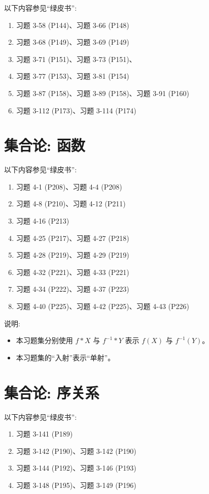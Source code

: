 \documentclass{article}
\begin{document}
以下内容参见``绿皮书'':
\begin{enumerate}[(1)]
  \item 习题 3-58 (P144)、习题 3-66 (P148)
  \item 习题 3-68 (P149)、习题 3-69 (P149)
  \item 习题 3-71 (P151)、习题 3-73 (P151)、
  \item 习题 3-77 (P153)、习题 3-81 (P154)
  \item 习题 3-87 (P158)、习题 3-89 (P158)、习题 3-91 (P160)
  \item 习题 3-112 (P173)、习题 3-114 (P174)
\end{enumerate}
\section{集合论: 函数}

以下内容参见``绿皮书'':
\begin{enumerate}[(1)]
  \item 习题 4-1 (P208)、习题 4-4 (P208)
  \item 习题 4-8 (P210)、习题 4-12 (P211)
  \item 习题 4-16 (P213)
  \item 习题 4-25 (P217)、习题 4-27 (P218)
  \item 习题 4-28 (P219)、习题 4-29 (P219)
  \item 习题 4-32 (P221)、习题 4-33 (P221)
  \item 习题 4-34 (P222)、习题 4-37 (P223)
  \item 习题 4-40 (P225)、习题 4-42 (P225)、习题 4-43 (P226)
\end{enumerate}

说明:
\begin{itemize}
  \item 本习题集分别使用 $f \ast X$ 与 $f^{-1} \ast Y$ 表示 $f(X)$ 与 $f^{-1}(Y)$。
  \item 本习题集的``入射''表示``单射''。
\end{itemize}
\section{集合论: 序关系}

以下内容参见``绿皮书'':
\begin{enumerate}[(1)]
  \item 习题 3-141 (P189)
  \item 习题 3-142 (P190)、习题 3-142 (P190)
  \item 习题 3-144 (P192)、习题 3-146 (P193)
  \item 习题 3-148 (P195)、习题 3-149 (P196)
\end{enumerate}
\end{document}
